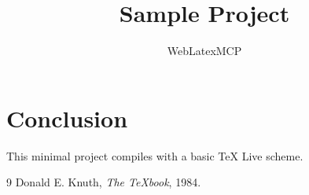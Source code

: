 \documentclass{article}
\title{Sample Project}
\author{WebLatexMCP}
\begin{document}
\maketitle


\section{Conclusion}
This minimal project compiles with a basic TeX Live scheme.

\begin{thebibliography}{9}
 Donald E. Knuth, \emph{The \TeX book}, 1984.
\end{thebibliography}
\end{document}
